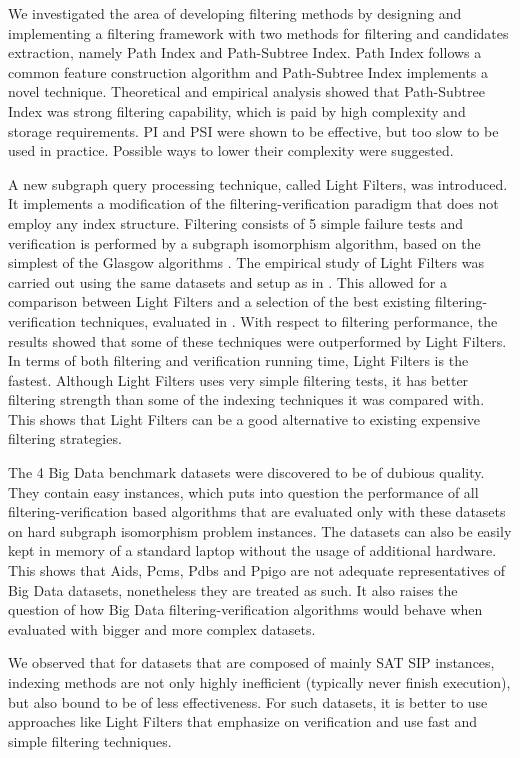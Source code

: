 \documentclass{l4proj}
\begin{document}
We investigated the area of developing filtering methods by designing and implementing a filtering framework with two methods for filtering and candidates extraction, namely Path Index and Path-Subtree Index. Path Index follows a common feature construction algorithm and Path-Subtree Index implements a novel technique. Theoretical and empirical analysis showed that Path-Subtree Index was strong filtering capability, which is paid by high complexity and storage requirements. PI and PSI were shown to be effective, but too slow to be used in practice. Possible ways to lower their complexity were suggested.

A new subgraph query processing technique, called Light Filters, was introduced. It implements a modification of the filtering-verification paradigm that does not employ any index structure. Filtering consists of 5 simple failure tests and verification is performed by a subgraph isomorphism algorithm, based on the simplest of the Glasgow algorithms \cite{CP2015}. The empirical study of Light Filters was carried out using the same datasets and setup as in \cite{foteini}. This allowed for a comparison between Light Filters and a selection of the best existing filtering-verification techniques, evaluated in \cite{foteini}. With respect to filtering performance, the results showed that some of these techniques were outperformed by Light Filters. In terms of both filtering and verification running time, Light Filters is the fastest. Although Light Filters uses very simple filtering tests, it has better filtering strength than some of the indexing techniques it was compared with. This shows that Light Filters can be a good alternative to existing expensive filtering strategies.

The 4 Big Data benchmark datasets were discovered to be of dubious quality. They contain easy instances, which puts into question the performance of all filtering-verification based algorithms that are evaluated only with these datasets on hard subgraph isomorphism problem instances. The datasets can also be easily kept in memory of a standard laptop without the usage of additional hardware. This shows that Aids, Pcms, Pdbs and Ppigo are not adequate representatives of Big Data datasets, nonetheless they are treated as such. It also raises the question of how Big Data filtering-verification algorithms would behave when evaluated with bigger and more complex datasets.

We observed that for datasets that are composed of mainly SAT SIP instances, indexing methods are not only highly inefficient (typically never finish execution), but also bound to be of less effectiveness. For such datasets, it is better to use approaches like Light Filters that emphasize on verification and use fast and simple filtering techniques.
\end{document}
